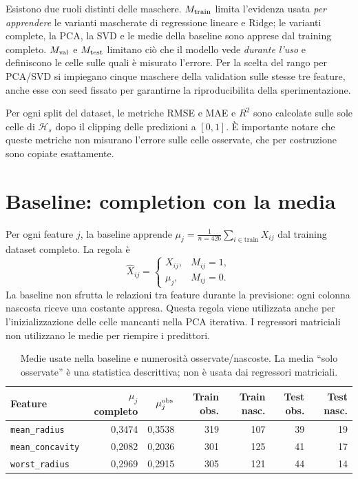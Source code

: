 \documentclass[10pt,a4paper]{article}
\newcommand{\Hidden}{\mathcal H}
\newcommand{\RMSE}{\operatorname{RMSE}}
\newcommand{\MAE}{\operatorname{MAE}}
\newcommand{\feat}[1]{\texttt{#1}}
\begin{document}
Esistono due ruoli distinti delle maschere. $M_{\rm train}$ limita l'evidenza usata \emph{per apprendere} le varianti 
mascherate di regressione lineare e Ridge; le varianti complete, la PCA, la SVD e le medie della baseline sono 
apprese dal training completo. $M_{\rm val}$ e $M_{\rm test}$ limitano ciò che il modello vede \emph{durante l'uso} 
e definiscono le celle sulle quali è misurato l'errore. Per la scelta del rango per PCA/SVD si impiegano cinque maschere della 
validation sulle stesse tre feature, anche esse con seed fissato per garantirne la riproducibilita della sperimentazione.

Per ogni split del dataset, le metriche RMSE e MAE e $R^2$ sono calcolate sulle sole celle di $\Hidden_s$ dopo il clipping 
delle predizioni a $[0,1]$.
È importante notare che queste metriche non misurano l'errore sulle celle osservate, che per costruzione sono copiate esattamente.
    
\section{Baseline: completion con la media}
Per ogni feature $j$, la baseline apprende $\mu_j=\frac{1}{n=426}\sum_{i\in\mathrm{train}}X_{ij}$ dal training dataset completo. La regola è
\[
\widehat X_{ij}=
\begin{cases}
X_{ij},&M_{ij}=1,\\
\mu_j,&M_{ij}=0.
\end{cases}
\]
La baseline non sfrutta le relazioni tra feature durante la previsione: ogni colonna nascosta riceve una costante appresa. 
Questa regola viene utilizzata anche per l'inizializzazione delle celle mancanti nella PCA iterativa. I regressori matriciali non utilizzano le medie per riempire i predittori.

\begin{table}[ht]
\centering\small
\caption{Medie usate nella baseline e numerosità osservate/nascoste. La media ``solo osservate'' è una statistica descrittiva; non è usata dai regressori matriciali.}
\label{tab:baseline}
\begin{tabular}{@{}lrrrrrr@{}}
\toprule
Feature & $\mu_j$ completo & $\mu^{\rm obs}_j$ & Train obs. & Train nasc. & Test obs. & Test nasc. \\
\midrule
\feat{mean\_radius} & 0,3474 & 0,3538 & 319 & 107 & 39 & 19 \\
\feat{mean\_concavity} & 0,2082 & 0,2036 & 301 & 125 & 41 & 17 \\
\feat{worst\_radius} & 0,2969 & 0,2915 & 305 & 121 & 44 & 14 \\
\bottomrule
\end{tabular}
\end{table}
\end{document}
